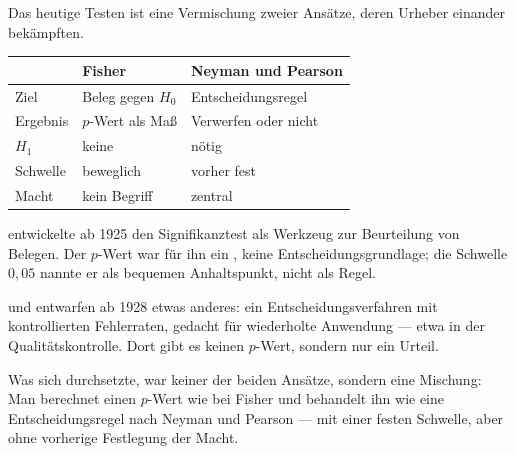 \begin{geschichte}
Das heutige Testen ist eine Vermischung zweier Ansätze, deren Urheber einander bekämpften.

\begin{center}
{\small
\renewcommand{\arraystretch}{1.5}
\begin{tabular}{@{}P{2.2cm}P{2.8cm}P{3.2cm}@{}}
\toprule
& \textbf{Fisher} & \textbf{Neyman und Pearson}\\
\midrule
Ziel & Beleg gegen $H_0$ & Entscheidungsregel\\
Ergebnis & $p$-Wert als Maß & Verwerfen oder nicht\\
$H_1$ & \textcolor{akzent}{keine} & \textcolor{gruen}{nötig}\\
Schwelle & \textcolor{akzent}{beweglich} & \textcolor{gruen}{vorher fest}\\
Macht & \textcolor{akzent}{kein Begriff} & \textcolor{gruen}{zentral}\\
\bottomrule
\end{tabular}}
\end{center}

 entwickelte ab 1925 den Signifikanztest als Werkzeug zur Beurteilung von Belegen. Der $p$-Wert war für ihn ein , keine Entscheidungsgrundlage; die Schwelle $0{,}05$ nannte er als bequemen Anhaltspunkt, nicht als Regel.

 und  entwarfen ab 1928 etwas anderes: ein Entscheidungsverfahren mit kontrollierten Fehlerraten, gedacht für wiederholte Anwendung --- etwa in der Qualitätskontrolle. Dort gibt es keinen $p$-Wert, sondern nur ein Urteil.

\begin{center}
\begin{minipage}{0.9\textwidth}
\end{minipage}
\end{center}

Was sich durchsetzte, war keiner der beiden Ansätze, sondern eine Mischung: Man berechnet einen $p$-Wert wie bei Fisher und behandelt ihn wie eine Entscheidungsregel nach Neyman und Pearson --- mit einer festen Schwelle, aber ohne vorherige Festlegung der Macht.

\begin{center}
\begin{minipage}{0.9\textwidth}
\end{minipage}
\end{center}
\end{geschichte}

